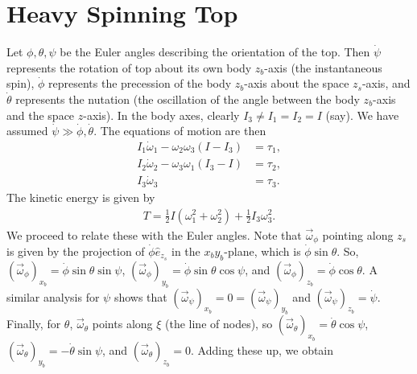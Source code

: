 \section{Heavy Spinning Top}

Let $\phi,\theta,\psi$ be the Euler angles describing the orientation of the top. Then $\dot{\psi}$ represents the rotation of top about its own body $z_{b}$-axis (the instantaneous spin), $\dot{\phi}$ represents the precession of the body $z_{b}$-axis about the space $z_{s}$-axis, and $\dot{\theta}$ represents the nutation (the oscillation of the angle between the body $z_{b}$-axis and the space $z$-axis). In the body axes, clearly $I_{3} \neq I_{1} = I_{2} = I$ (say). We have assumed $\dot{\psi} \gg \dot{\phi}, \dot{\theta}$. The equations of motion are then
\begin{align}
    I_{1} \dot{\omega}_{1} - \omega_{2}\omega_{3} (I-I_{3}) &= \tau_{1}, \\
    I_{2} \dot{\omega}_{2} - \omega_{3}\omega_{1} (I_{3}-I) &= \tau_{2}, \\
    I_{3} \dot{\omega}_{3} &= \tau_{3}.
\end{align}
The kinetic energy is given by
\begin{align}
    T = \frac{1}{2}I(\omega_{1}^{2} + \omega_{2}^{2}) + \frac{1}{2} I_{3} \omega_{3}^{2}.
\end{align}
We proceed to relate these with the Euler angles. Note that $\vec{\omega}_{\phi}$ pointing along $z_{s}$ is given by the projection of $\dot{\phi} \hat{e}_{z_{s}}$ in the $x_{b}y_{b}$-plane, which is $\dot{\phi} \sin \theta$. So, $(\vec{\omega}_{\phi})_{x_{b}} = \dot{\phi} \sin \theta \sin \psi$, $(\vec{\omega}_{\phi})_{y_{b}} = \dot{\phi} \sin \theta \cos \psi$, and $(\vec{\omega}_{\phi})_{z_{b}} = \dot{\phi} \cos \theta$. A similar analysis for $\psi$ shows that $(\vec{\omega}_{\psi})_{x_{b}} = 0 = (\vec{\omega}_{\psi})_{y_{b}}$ and $(\vec{\omega}_{\psi})_{z_{b}} = \dot{\psi}$. Finally, for $\theta$, $\vec{\omega}_{\theta}$ points along $\xi$ (the line of nodes), so $(\vec{\omega}_{\theta})_{x_{b}} = \dot{\theta} \cos \psi$, $(\vec{\omega}_{\theta})_{y_{b}} = -\dot{\theta} \sin \psi$, and $(\vec{\omega}_{\theta})_{z_{b}} = 0$. Adding these up, we obtain

